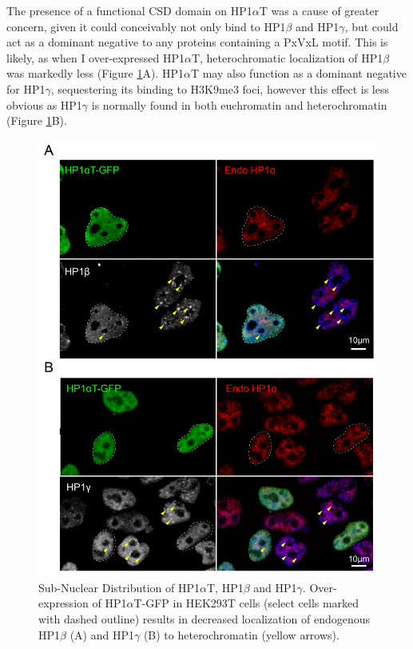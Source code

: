 \documentclass[onehalf,12pt]{beavtex}
\begin{document}
  \FloatBarrier
  
  The presence of a functional CSD domain on HP1\(\alpha\)T was a cause of
  greater concern, given it could conceivably not only bind to
  HP1\(\beta\) and HP1\(\gamma\), but could act as a dominant negative to
  any proteins containing a PxVxL motif. This is likely, as when I
  over-expressed HP1\(\alpha\)T, heterochromatic localization of
  HP1\(\beta\) was markedly less (Figure \ref{fig:HP1aTHP1BHP1g}A).
  HP1\(\alpha\)T may also function as a dominant negative for
  HP1\(\gamma\), sequestering its binding to H3K9me3 foci, however this
  effect is less obvious as HP1\(\gamma\) is normally found in both
  euchromatin and heterochromatin (Figure \ref{fig:HP1aTHP1BHP1g}B).
  
  \begin{figure}
  
  {\centering \includegraphics[width=1\linewidth, ]{./figure/results/HP1aTHP1BHP1g} 
  
  }
  
  \caption[Sub-Nuclear Distribution of HP1$\alpha$T and HP1$\beta$]{Sub-Nuclear Distribution of HP1$\alpha$T, HP1$\beta$ and HP1$\gamma$. Over-expression of HP1$\alpha$T-GFP in HEK293T cells (select cells marked with dashed outline) results in decreased localization of endogenous HP1$\beta$ (A) and HP1$\gamma$ (B) to heterochromatin (yellow arrows).}\label{fig:HP1aTHP1BHP1g}
  \end{figure}
  
\end{document}
